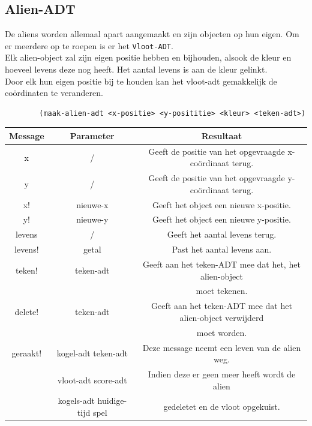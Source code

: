 \documentclass[]{article}
\begin{document}
\subsection{Alien-ADT}
De aliens worden allemaal apart aangemaakt en zijn objecten op hun eigen. Om er meerdere op te roepen is er het \texttt{Vloot-ADT}. \\
Elk alien-object zal zijn eigen positie hebben en bijhouden, alsook de kleur en hoeveel levens deze nog heeft. Het aantal levens is aan de kleur gelinkt. \\ 
Door elk hun eigen positie bij te houden kan het vloot-adt gemakkelijk de co\"{o}rdinaten te veranderen. 
\begin{center}
	\begin{lstlisting}
		(maak-alien-adt <x-positie> <y-posititie> <kleur> <teken-adt>)
	\end{lstlisting}

\begin{tabular}{|c|c|c|}
	\hline  \textbf{Message} & \textbf{Parameter} & \textbf{Resultaat}  \\ 
	\hline  x  & / &  Geeft de positie van het opgevraagde x-co\"{o}rdinaat terug.\\
	\hline  y  & / & Geeft de positie van het opgevraagde y-co\"{o}rdinaat terug.\\  
	\hline x! & nieuwe-x & Geeft het object een nieuwe x-positie.   \\
	\hline y! & nieuwe-y & Geeft het object een nieuwe y-positie.  \\ 
	\hline levens & / & Geeft het aantal levens terug.  \\   
	\hline levens! & getal & Past het aantal levens aan. \\   
	\hline  teken! & teken-adt & Geeft aan het teken-ADT mee dat het, het alien-object \\ && moet tekenen. \\ 
	\hline  delete! & teken-adt & Geeft aan het teken-ADT mee dat het alien-object verwijderd \\ & &moet worden. \\ 
	\hline geraakt! & kogel-adt teken-adt & Deze message neemt een leven van de alien weg. \\ &   vloot-adt score-adt  &Indien deze er geen meer heeft wordt de alien \\ &kogels-adt  huidige-tijd spel & gedeletet en de vloot opgekuist. \\
	\hline
\end{tabular} 
\end{center}
\end{document}
